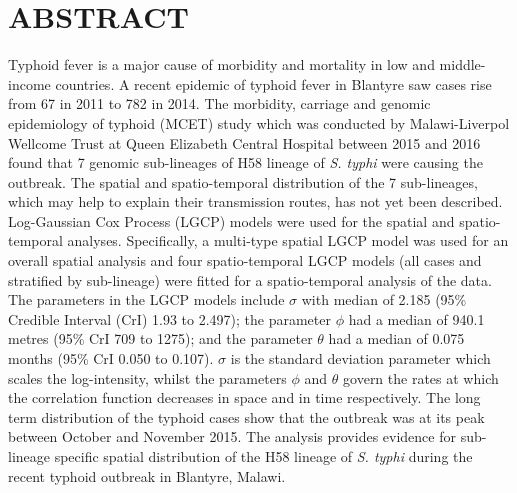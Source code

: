 \setcounter{chapter}{0}
\setcounter{secnumdepth}{0}
\cfoot{\thepage}
\setcounter{page}{v}

\sectionfont{\centering\MakeUppercase}

\chapter*{ABSTRACT}

Typhoid fever is a major cause of morbidity and mortality in low and middle-income countries. A recent epidemic of typhoid fever in Blantyre saw cases rise from 67 in 2011 to 782 in 2014. The morbidity, carriage and genomic epidemiology of typhoid (MCET) study which was conducted by Malawi-Liverpol Wellcome Trust at Queen Elizabeth Central Hospital between 2015 and 2016 found that 7 genomic sub-lineages of H58 lineage of \textit{S. typhi} were causing the outbreak. The spatial and spatio-temporal distribution of the 7 sub-lineages, which may help to explain their transmission routes, has not yet been described. Log-Gaussian Cox Process (LGCP) models were used for the spatial and spatio-temporal analyses. Specifically, a multi-type spatial LGCP model was used for an overall spatial analysis and four spatio-temporal LGCP models (all cases and stratified by sub-lineage) were fitted for a spatio-temporal analysis of the data. The parameters in the LGCP models include $\sigma$ with median of 2.185 (95\% Credible Interval (CrI) 1.93 to 2.497); the parameter $\phi$ had a median of 940.1 metres (95\% CrI 709 to 1275); and the parameter $\theta$ had a median of 0.075 months (95\% CrI 0.050 to 0.107). $\sigma$ is the standard deviation parameter which scales the log-intensity, whilst the parameters $\phi$ and $\theta$ govern the rates at which the correlation function decreases in space and in time respectively. The long term distribution of the typhoid cases show that the outbreak was at its peak between October and November 2015. The analysis provides evidence for sub-lineage specific spatial distribution of the H58 lineage of \textit{S. typhi} during the recent typhoid outbreak in Blantyre, Malawi.

\newpage